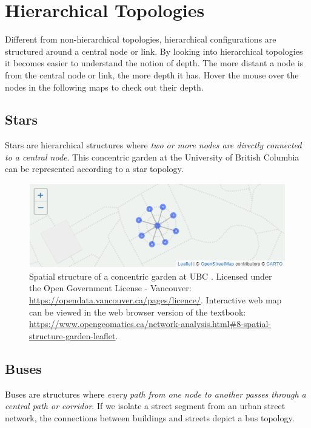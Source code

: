 \documentclass[
]{book}
\begin{document}
\section{Hierarchical Topologies}\label{hierarchical-topologies}

Different from non-hierarchical topologies, hierarchical configurations are structured around a central node or link. By looking into hierarchical topologies it becomes easier to understand the notion of depth. The more distant a node is from the central node or link, the more depth it has. Hover the mouse over the nodes in the following maps to check out their depth.

\subsection{Stars}\label{stars}

Stars are hierarchical structures where \emph{two or more nodes are directly connected to a central node}. This concentric garden at the University of British Columbia can be represented according to a star topology.



\begin{figure}
\includegraphics[width=8.61in]{images/08-Spatial-structure-of-a-concentric-garden-at-UBC-static} \caption{Spatial structure of a concentric garden at UBC \citep{city_of_vancouver_open_nodate}. Licensed under the Open Government License - Vancouver: \url{https://opendata.vancouver.ca/pages/licence/}. Interactive web map can be viewed in the web browser version of the textbook: \url{https://www.opengeomatics.ca/network-analysis.html\#8-spatial-structure-garden-leaflet}.}\label{fig:8-spatial-structure-garden-leaflet}
\end{figure}

\subsection{Buses}\label{buses}

Buses are structures where \emph{every path from one node to another passes through a central path or corridor}. If we isolate a street segment from an urban street network, the connections between buildings and streets depict a bus topology.
\end{document}
